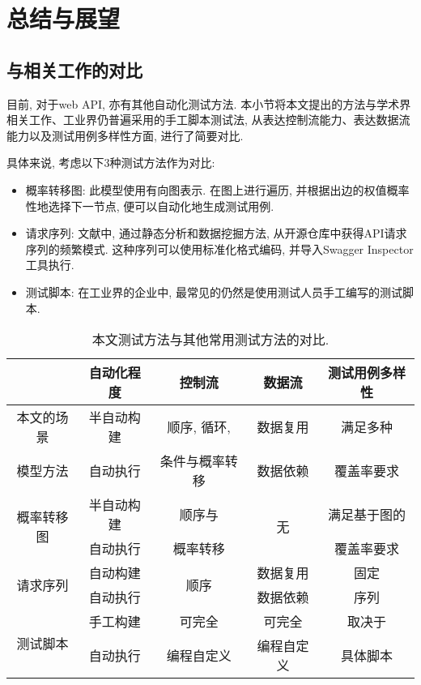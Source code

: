 \chapter{总结与展望}
    \section{与相关工作的对比}
        目前, 对于web API, 亦有其他自动化测试方法. 本小节将本文提出的方法与学术界相关工作、工业界仍普遍采用的手工脚本测试法, 从表达控制流能力、表达数据流能力以及测试用例多样性方面, 进行了简要对比.
    
        具体来说, 考虑以下3种测试方法作为对比:
        \begin{itemize}
            \item 概率转移图\cite{junyiw17}: 此模型使用有向图表示. 在图上进行遍历, 并根据出边的权值概率性地选择下一节点, 便可以自动化地生成测试用例.
            
            \item 请求序列: 文献\cite{taox06}\cite{xiaodongg16}中, 通过静态分析和数据挖掘方法, 从开源仓库中获得API请求序列的频繁模式. 这种序列可以使用标准化格式编码, 并导入Swagger Inspector工具\cite{swaggerinspetor17}执行.
            
            \item 测试脚本: 在工业界的企业中, 最常见的仍然是使用测试人员手工编写的测试脚本.
        \end{itemize}
        
        \begin{table}[!htb]
            \centering
            \begin{tabular}{ccccc}
                \toprule
                 & 自动化程度 & 控制流 & 数据流 & 测试用例多样性 \\
                \midrule
                本文的场景 & 半自动构建 & 顺序, 循环,  & 数据复用 & 满足多种 \\
                模型方法   & 自动执行 & 条件与概率转移 & 数据依赖 & 覆盖率要求 \\
                \hline
                \multirow{2}{*}{概率转移图\cite{junyiw17}} & 半自动构建 & 顺序与 & \multirow{2}{*}{无} & 满足基于图的 \\
                & 自动执行 & 概率转移 &  & 覆盖率要求 \\
                \hline
                \multirow{2}{*}{请求序列\cite{taox06}\cite{xiaodongg16}} & 自动构建 & \multirow{2}{*}{顺序} & 数据复用 & 固定 \\
                & 自动执行 &  & 数据依赖 & 序列 \\
                \hline
                \multirow{2}{*}{测试脚本} & 手工构建 & 可完全 & 可完全 & 取决于 \\
                & 自动执行 & 编程自定义 & 编程自定义 & 具体脚本 \\
                \bottomrule
            \end{tabular}
            \caption{本文测试方法与其他常用测试方法的对比.}
            \label{tab:related_work_compare}
        \end{table}
        
